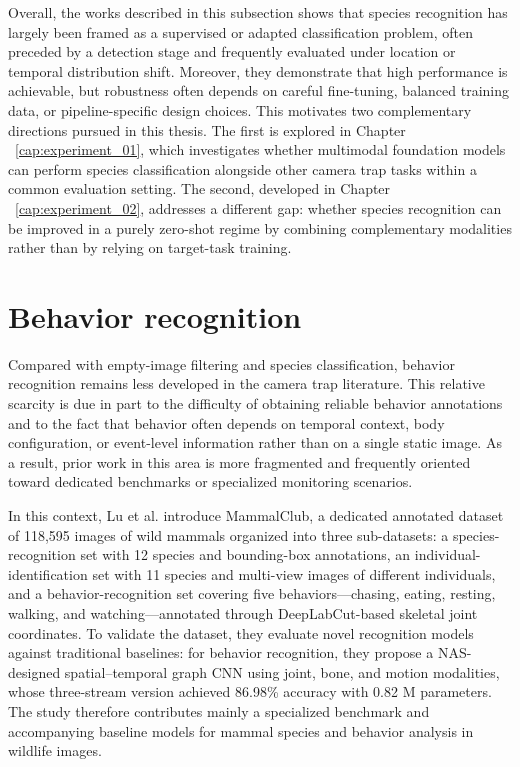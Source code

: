 Overall, the works described in this subsection shows that species recognition has largely been framed as a supervised or adapted classification problem, often preceded by a detection stage and frequently evaluated under location or temporal distribution shift. Moreover, they demonstrate that high performance is achievable, but robustness often depends on careful fine-tuning, balanced training data, or pipeline-specific design choices. This motivates two complementary directions pursued in this thesis. The first is explored in Chapter ~\ref{cap:experiment_01}, which investigates whether multimodal foundation models can perform species classification alongside other camera trap tasks within a common evaluation setting. The second, developed in Chapter ~\ref{cap:experiment_02}, addresses a different gap: whether species recognition can be improved in a purely zero-shot regime by combining complementary modalities rather than by relying on target-task training.

\section{Behavior recognition}

Compared with empty-image filtering and species classification, behavior recognition remains less developed in the camera trap literature. This relative scarcity is due in part to the difficulty of obtaining reliable behavior annotations and to the fact that behavior often depends on temporal context, body configuration, or event-level information rather than on a single static image. As a result, prior work in this area is more fragmented and frequently oriented toward dedicated benchmarks or specialized monitoring scenarios.

In this context, Lu et al. \cite{lu2023mammalclub} introduce MammalClub, a dedicated annotated dataset of 118,595 images of wild mammals organized into three sub-datasets: a species-recognition set with 12 species and bounding-box annotations, an individual-identification set with 11 species and multi-view images of different individuals, and a behavior-recognition set covering five behaviors—chasing, eating, resting, walking, and watching—annotated through DeepLabCut-based skeletal joint coordinates. To validate the dataset, they evaluate novel recognition models against traditional baselines: for behavior recognition, they propose a NAS-designed spatial–temporal graph CNN using joint, bone, and motion modalities, whose three-stream version achieved 86.98\% accuracy with 0.82 M parameters. The study therefore contributes mainly a specialized benchmark and accompanying baseline models for mammal species and behavior analysis in wildlife images.

